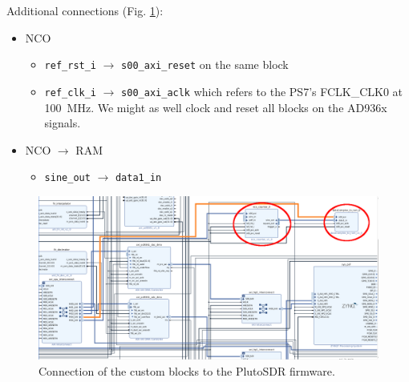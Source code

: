 \documentclass[12pt,oneside]{article}
\begin{document}

Additional connections (Fig. \ref{con}):

\begin{itemize}
\item NCO
	\begin{itemize}
	\item {\tt ref\_rst\_i} $\to$ {\tt s00\_axi\_reset} on the same block
	\item {\tt ref\_clk\_i} $\to$ {\tt s00\_axi\_aclk} which refers to the PS7's
FCLK\_CLK0 at 100~MHz. We might as well clock and reset all blocks on the AD936x signals.
	\end{itemize}
\item NCO $\to$ RAM
        \begin{itemize}
	\item {\tt sine\_out} $\to$ {\tt data1\_in} %
        \end{itemize}
\end{itemize}

\begin{figure}[h!tb]
\begin{center}
\includegraphics[width=\linewidth]{1.png}
\end{center}
\caption{Connection of the custom blocks to the PlutoSDR firmware.}
\label{con}
\end{figure}
\end{document}
